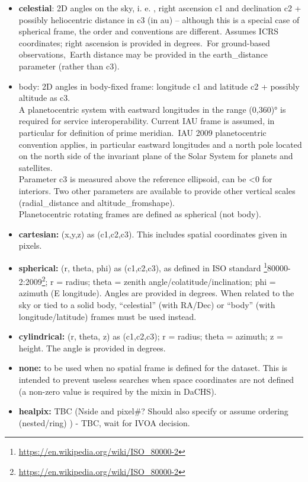 \documentclass[11pt,a4paper]{ivoa}
\begin{document}
\begin{itemize}
\item \textbf{celestial}: 2D angles on the sky, i. e. , right ascension c1 and declination c2 + possibly heliocentric distance in c3 (in au) – although this is a special case of spherical frame, the order and conventions are different. Assumes ICRS coordinates; right ascension is provided in degrees. For ground-based observations, Earth distance may be provided in the earth\_distance parameter (rather than c3). 
\item body: 2D angles in body-fixed frame: longitude c1 and latitude c2 + possibly altitude as c3. \\A planetocentric system with eastward longitudes in the range (0,360)° is required for service interoperability. Current IAU frame is assumed, in particular for definition of prime meridian. IAU 2009 planetocentric convention applies, in particular eastward longitudes and a north pole located on the north side of the invariant plane of the Solar System for planets and satellites.  \\Parameter c3 is measured above the reference ellipsoid, can be <0 for interiors. Two other parameters are available to provide other vertical scales (radial\_distance and altitude\_fromshape). \\Planetocentric rotating frames are defined as spherical (not body).
\item \textbf{cartesian:} (x,y,z) as (c1,c2,c3). This includes spatial coordinates given in pixels.
\item \textbf{spherical:} (r, theta, phi) as (c1,c2,c3), as defined in ISO standard \footnote{\url{https://en.wikipedia.org/wiki/ISO_80000-2}}80000-2:2009\footnote{\url{https://en.wikipedia.org/wiki/ISO_80000-2}}; r = radius; theta = zenith angle/colatitude/inclination; phi = azimuth (E longitude). Angles are provided in degrees. When related to the sky or tied to a solid body, ``celestial'' (with RA/Dec) or ``body'' (with longitude/latitude) frames must be used instead.
\item \textbf{cylindrical:} (r, theta, z) as (c1,c2,c3); r = radius; theta = azimuth; z = height. The angle is provided in degrees.
\item \textbf{none:} to be used when no spatial frame is defined for the dataset. This is intended to prevent useless searches when space coordinates are not defined (a non-zero value is required by the mixin in DaCHS).
\item \textbf{healpix:} TBC (Nside and pixel\#? Should also specify or assume ordering (nested/ring) ) - TBC, wait for IVOA decision.
\end{itemize}
\end{document}
